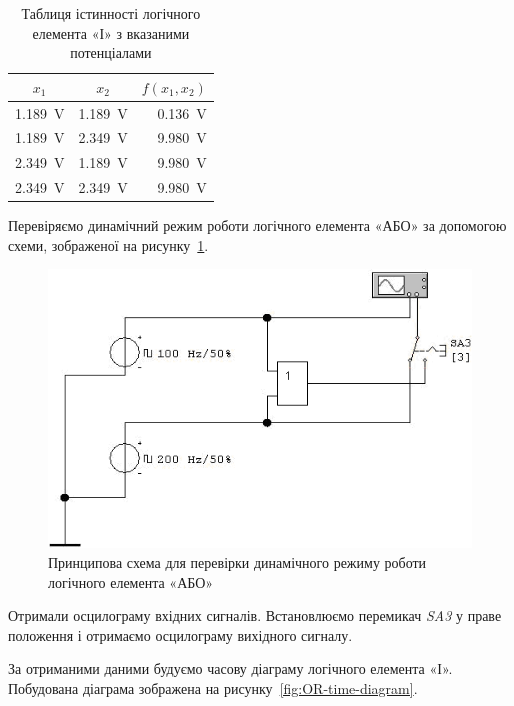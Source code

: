 \documentclass[a4paper,oneside,DIV=10,12pt]{scrartcl}
\newcommand\schel[1]{\textit{#1}}
\begin{document}
			\begin{table}[!htbp]
			\centering
				\begin{tabular}{ccr}
					\toprule
						$x_1$ & $x_2$ & $f(x_1, x_2)$\\
					\midrule
						\SI{1,189}{\volt} & \SI{1,189}{\volt} & \SI{0,136}{\volt}\\
						\SI{1,189}{\volt} & \SI{2,349}{\volt} & \SI{9,980}{\volt}\\
						\SI{2,349}{\volt} & \SI{1,189}{\volt} & \SI{9,980}{\volt}\\
						\SI{2,349}{\volt} & \SI{2,349}{\volt} & \SI{9,980}{\volt}\\
					\bottomrule
				\end{tabular}
			\caption{Таблиця істинності логічного елемента «І» з вказаними потенціалами}
			\label{fig:OR-truth-table-potentials}
			\end{table}
			
			Перевіряємо динамічний режим роботи логічного елемента «АБО» за допомогою схеми, зображеної на рисунку~\ref{fig:OR-dynamic-mode-schematic}.
			
			\begin{figure}[!htbp]
			\centering
				\includegraphics[]{schematics/03-02-OR.png}
			\caption{Принципова схема для перевірки динамічного режиму роботи логічного елемента «АБО»}
			\label{fig:OR-dynamic-mode-schematic}
			\end{figure}
			
			Отримали осцилограму вхідних сигналів. Встановлюємо перемикач \schel{SA3} у праве положення і отримаємо осцилограму вихідного сигналу.
			
			За отриманими даними будуємо часову діаграму логічного елемента «І». Побудована діаграма зображена на рисунку~\ref{fig:OR-time-diagram}.
			
\end{document}
